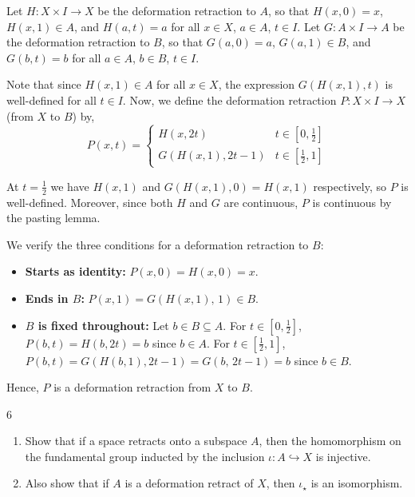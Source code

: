 \documentclass[12pt]{article}
\begin{document}
\begin{solution}
    \bbni

    Let $H: X \times I \to X$ be the deformation retraction to $A$, so that $H(x,0) = x$, $H(x,1) \in A$, and $H(a,t) = a$ for all $x \in X$, $a \in A$, $t \in I$. Let $G: A \times I \to A$ be the deformation retraction to $B$, so that $G(a,0) = a$, $G(a,1) \in B$, and $G(b,t) = b$ for all $a \in A$, $b \in B$, $t \in I$.
   
    Note that since $H(x,1) \in A$ for all $x \in X$, the expression $G(H(x,1), t)$ is well-defined for all $t \in I$. Now, we define the deformation retraction $P: X \times I \to X$ (from $X$ to $B$) by, 
    \[P(x,t) = \begin{cases}
                H(x, 2t) & t \in \left[0, \frac{1}{2}\right] \\
        G(H(x, 1), 2t-1) & t \in \left[\frac{1}{2}, 1\right] 
    \end{cases}\]


    At $t = \tfrac{1}{2}$ we have $H(x, 1)$ and $G(H(x,1), 0) = H(x,1)$ respectively, so $P$ is well-defined. Moreover, since both $H$ and $G$ are continuous, $P$ is continuous by the pasting lemma. 

    We verify the three conditions for a deformation retraction to $B$:
    \begin{itemize}
        \item \textbf{Starts as identity:} $P(x, 0) = H(x, 0) = x$.
        \item \textbf{Ends in $B$:} $P(x, 1) = G(H(x,1),\, 1) \in B$.
        \item \textbf{$B$ is fixed throughout:} Let $b \in B \subseteq A$.
        For $t \in \left[0, \frac{1}{2}\right]$, $P(b,t) = H(b, 2t) = b$ since
        $b \in A$. For $t \in \left[\frac{1}{2},1\right]$, $P(b,t) = G(H(b,1),
        2t-1) = G(b,\, 2t-1) = b$ since $b \in B$.
    \end{itemize}
    Hence, $P$ is a deformation retraction from $X$ to $B$. 
\end{solution}

\newpage 

\begin{problem}{6}
    \begin{enumerate}
        \item [(a)]  Show that if a space retracts onto a subspace $A$, then the homomorphism on the fundamental group inducted by the inclusion $\iota : A \hookrightarrow X$ is injective. 
        \item [(b)] Also show that if $A$ is a deformation retract of $X$, then $\iota_\star$ is an isomorphism.
    \end{enumerate}
\end{problem}
\end{document}
